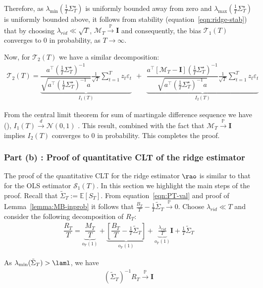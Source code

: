 \documentclass[11pt,letterpaper]{article}
\newcommand{\Prob}{\mathbb{P}}
\newcommand{\rpen}{\lambda_{rid}}
\newcommand{\Exs}{\mathbb{E}}
\newcommand{\BT}{{\Sigma^\star_T}}
\newcommand{\Id}{\mathbf{I}}
\newcommand{\z}{z}
\newcommand{\PT}{\tilde{\Sigma}_T}
\newcommand{\stao}{\mathcal{S}_1(T)}
\theoremstyle{plain}
\theoremstyle{definition}  %
\begin{document}
\noindent Therefore, as $\lambda_{\min}(\frac{1}{T} \BT)$ is uniformly bounded away from zero and $\lambda_{\max}(\frac{1}{T} \BT)$ is uniformly bounded above, it follows from stability (equation~\eqref{eqn:ridge-stab}) that by choosing $\rpen \ll \sqrt{T}$, $\mathcal{M}_T \xrightarrow{\Prob} \Id$ and consequently, the bias $\mathcal{T}_1(T) $ converges to $0$ in probability, as $T \rightarrow \infty$. 

\noindent Now, for $\mathcal{T}_2(T)$ we have a similar decomposition:
\begin{align}\label{eqn:tautwo-decom}
  \mathcal{T}_2(T) =  \underbrace{\dfrac{a^\top \left( \frac{1}{T} \BT \right)^{-1}}{\sqrt{a^\top  \left( \frac{1}{T} \BT \right)^{-1}a}  } \frac{1}{\sqrt{T}} 
  \sum^T_{t=1} \z_t \varepsilon_t }_{I_1(T)}
  \ \ + \ \
  \underbrace{\dfrac{a^\top [\mathcal{M}_T - \Id]\left( \frac{1}{T} \BT \right)^{-1}}{\sqrt{a^\top  \left( \frac{1}{T} \BT \right)^{-1}a}  } \frac{1}{\sqrt{T}} 
  \sum^T_{t=1} \z_t \varepsilon_t}_{I_2(T)}
\end{align}

\noindent From the central limit theorem for sum of martingale difference sequence we have (\citet{dvoretzky1972asymptotic}), $I_1(T) \xrightarrow{d} \mathcal{N}(0,1)$ . This result, combined with the fact that $\mathcal{M}_T \xrightarrow{\Prob} \Id$ implies $I_2(T)$ converges to $0$ in probability. This completes the proof. 

\subsubsection*{Part (b) : Proof of quantitative CLT of the ridge estimator}
\label{sec:ridgre-berry}

The proof of the quantitative CLT for the ridge estimator $\rao$ is similar to that for the OLS estimator $\stao$. In this section we highlight the main steps of the proof. Recall that $\PT := \Exs[S_T]$. From equation~\eqref{eqn:PT-val} and proof of Lemma~\ref{lemma:MB-inprob} it follows that $\frac{B_T}{T}-\frac{1}{T} \PT \xrightarrow{\Prob} 0 $. Choose $\rpen \ll T$ and consider the following decomposition of $R_T$:
\begin{align}
    \dfrac{R_T}{T} 
     = \underbrace{\dfrac{M_T}{T}}_{o_{\Prob}(1)} + \underbrace{\left[\dfrac{B_T}{T}-\frac{1}{T} \PT \right]}_{o_{\Prob}(1)} + \underbrace{\frac{\rpen}{T}}_{o_\Prob(1)} \Id+ \frac{1}{T} \PT  
\end{align}

\noindent As $\lambda_{\min} (\PT) > \laml$, we have
\begin{align}\label{eqn:RT-stabtwo}
    (\PT)^{-1}R_T \xrightarrow{\Prob} \Id
\end{align}
\end{document}
